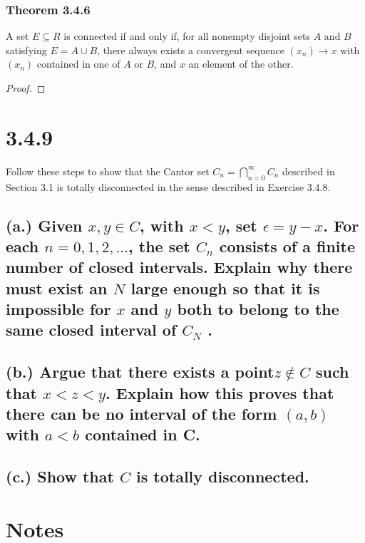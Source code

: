 \documentclass{article}
\begin{document}
\subsubsection*{\textbf{Theorem 3.4.6}}
A set $E \subseteq R$ is connected if and only if, for all nonempty
disjoint sets $A$ and $B$ satisfying $E = A \cup B$, there always exists a convergent sequence $(x_n) \rightarrow x$ with $(x_n)$ contained in one of $A$ or $B$, and $x$ an element of the other.

\begin{proof}



\end{proof}


\section*{3.4.9}
Follow these steps to show that the Cantor set $ C_n = \bigcap\limits^\infty_{n=0} C_n$ described in Section 3.1 is totally disconnected in the sense described in Exercise 3.4.8.

\subsection*{(a.)  Given $x, y \in C$, with $x < y$, set $\epsilon = y - x$. For each $n = 0, 1, 2,... $, the set $C_n$ consists of a finite number of closed intervals. Explain why there must exist an $N$ large enough so that it is impossible for $x$ and $y$ both to belong to the same closed interval of $C_N$ .}



\subsection*{(b.) Argue that there exists a point$ z \notin C$ such that $x<z<y$. Explain how
this proves that there can be no interval of the form $(a, b)$ with $a<b$ contained
in C.}



\subsection*{(c.) Show that $C$ is totally disconnected.}










\section*{Notes}
\end{document}
